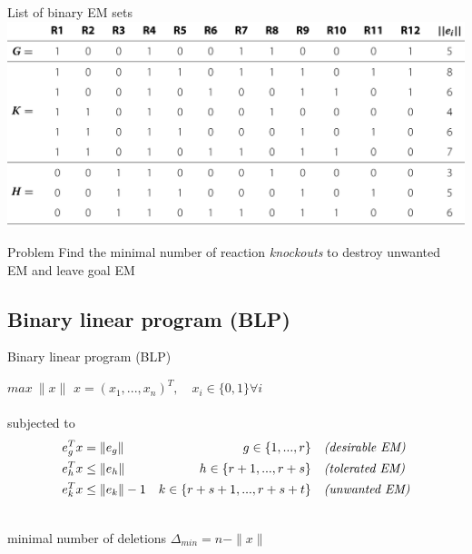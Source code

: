 \documentclass{beamer}
\begin{document}
\begin{frame}{List of binary EM sets}
    \includegraphics[width=\textwidth]{grafik/table1b}
\pause    
    \begin{block}{Problem}
        Find the minimal number of reaction \emph{knockouts} to destroy unwanted EM
        and leave goal EM
    \end{block}
\end{frame}

\subsection{Binary linear program (BLP)}


\begin{frame}{Binary linear program (BLP)}
    
$max ~\|x\|$ \hfill $x = (x_{1}, ..., x_{n})^{T}, \quad x_{i} \in \{0, 1\} \forall i$ \\
~\\
\pause
subjected to  
\begin{align*}
    e^{T}_{g} x & =       \|e_{g}\|      & g \in \{1, ..., r\}     
    & \quad\text{\emph{(desirable EM)}}\\
    e^{T}_{h} x & \leq    \|e_{h}\|     & h \in \{r+1, ..., r+s\} 
    & \quad\text{\emph{(tolerated EM)}}\\
    e^{T}_{k} x & \leq    \|e_{k}\|-1  & k \in \{r+s+1, ..., r+s+t\}
    & \quad\text{\emph{(unwanted EM)}}\\
\end{align*}

\pause
~\\
minimal number of deletions $\Delta_{min} = n - \|x\|$

\end{frame}
\end{document}
